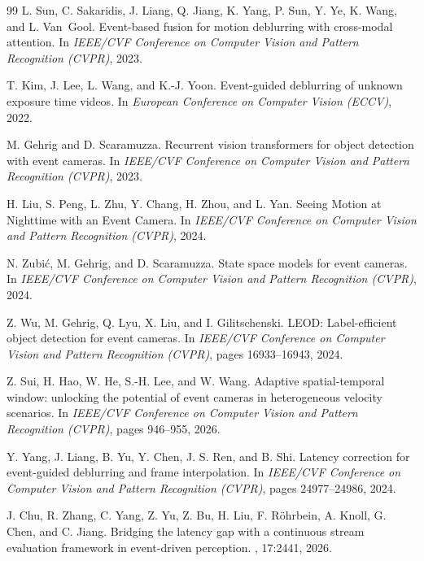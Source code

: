 \documentclass[10pt,twocolumn,letterpaper]{article}
\begin{document}
{\begin{thebibliography}{99}
L. Sun, C. Sakaridis, J. Liang, Q. Jiang, K. Yang, P. Sun, Y. Ye, K. Wang, and
L. Van~Gool.
\newblock Event-based fusion for motion deblurring with cross-modal attention.
\newblock In {\em IEEE/CVF Conference on Computer Vision and Pattern Recognition
(CVPR)}, 2023.

T. Kim, J. Lee, L. Wang, and K.-J. Yoon.
\newblock Event-guided deblurring of unknown exposure time videos.
\newblock In {\em European Conference on Computer Vision (ECCV)}, 2022.

M. Gehrig and D. Scaramuzza.
\newblock Recurrent vision transformers for object detection with event cameras.
\newblock In {\em IEEE/CVF Conference on Computer Vision and Pattern Recognition
(CVPR)}, 2023.

H. Liu, S. Peng, L. Zhu, Y. Chang, H. Zhou, and L. Yan.
\newblock Seeing Motion at Nighttime with an Event Camera.
\newblock In {\em IEEE/CVF Conference on Computer Vision and Pattern Recognition
(CVPR)}, 2024.

N. Zubi\'c, M. Gehrig, and D. Scaramuzza.
\newblock State space models for event cameras.
\newblock In {\em IEEE/CVF Conference on Computer Vision and Pattern Recognition
(CVPR)}, 2024.

Z. Wu, M. Gehrig, Q. Lyu, X. Liu, and I. Gilitschenski.
\newblock LEOD: Label-efficient object detection for event cameras.
\newblock In {\em IEEE/CVF Conference on Computer Vision and Pattern Recognition
(CVPR)}, pages 16933--16943, 2024.

Z. Sui, H. Hao, W. He, S.-H. Lee, and W. Wang.
\newblock Adaptive spatial-temporal window: unlocking the potential of event
cameras in heterogeneous velocity scenarios.
\newblock In {\em IEEE/CVF Conference on Computer Vision and Pattern Recognition
(CVPR)}, pages 946--955, 2026.

Y. Yang, J. Liang, B. Yu, Y. Chen, J. S. Ren, and B. Shi.
\newblock Latency correction for event-guided deblurring and frame interpolation.
\newblock In {\em IEEE/CVF Conference on Computer Vision and Pattern Recognition
(CVPR)}, pages 24977--24986, 2024.

J. Chu, R. Zhang, C. Yang, Z. Yu, Z. Bu, H. Liu, F. R\"ohrbein, A. Knoll,
G. Chen, and C. Jiang.
\newblock Bridging the latency gap with a continuous stream evaluation framework
in event-driven perception.
, 17:2441, 2026.


\end{thebibliography}}
\end{document}
